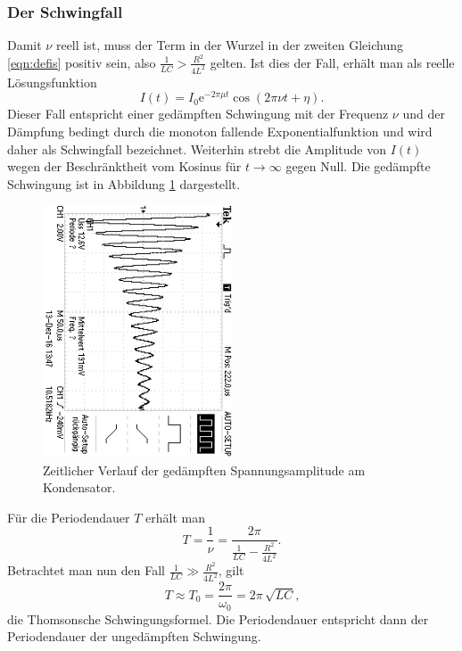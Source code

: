\subsubsection{Der Schwingfall}
Damit $\nu$ reell ist, muss der Term in der Wurzel in der zweiten Gleichung \eqref{eqn:defis}
positiv sein, also $\frac{1}{LC} > \frac{R^2}{4L^2}$ gelten.
Ist dies der Fall, erhält man als reelle Lösungsfunktion
\begin{equation}
	I(t) = I_0 \mathrm{e}^{-2 \pi \mu t} \cos(2\pi \nu t + \eta) \text{.}
	\label{eqn:schwingi}
\end{equation}
Dieser Fall entspricht einer gedämpften Schwingung mit der Frequenz $\nu$ und der Dämpfung
bedingt durch die monoton fallende Exponentialfunktion und wird daher als Schwingfall bezeichnet.
Weiterhin strebt die Amplitude von $I(t)$ wegen der Beschränktheit vom Kosinus für $t \to \infty$ gegen Null.
Die gedämpfte Schwingung ist in Abbildung \ref{fig:???} dargestellt.
\begin{figure}
	\centering
	\includegraphics[width=0.5\textwidth,angle=90]{Bilder/a)correct/F0002TEK.JPG}
	\caption{Zeitlicher Verlauf der gedämpften Spannungsamplitude am Kondensator.}
	\label{fig:???}
\end{figure}
Für die Periodendauer $T$ erhält man
\begin{equation}
	T = \frac{1}{\nu} = \frac{2 \pi}{\frac{1}{LC} - \frac{R^2}{4L^2}} \text{.}
\end{equation}
Betrachtet man nun den Fall $\frac{1}{LC} \gg \frac{R^2}{4L^2}$, gilt
\begin{equation}
	T \approx T_0 = \frac{2 \pi}{\omega_0} = 2 \pi \, \sqrt{LC} \text{,}
\end{equation}
die Thomsonsche Schwingungsformel. Die Periodendauer entspricht dann der Periodendauer der
ungedämpften Schwingung.

